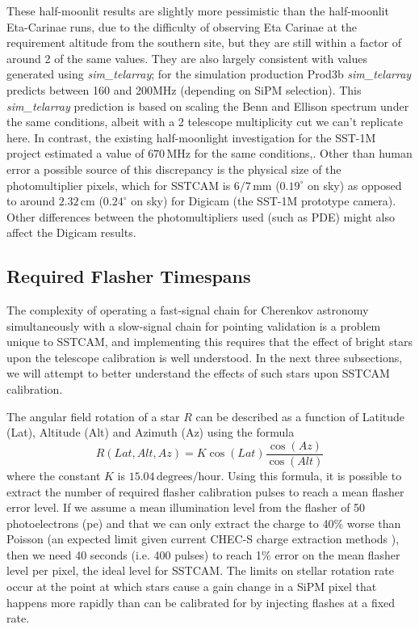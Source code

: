 These half-moonlit results are slightly more pessimistic than the half-moonlit Eta-Carinae runs, due to the difficulty of observing Eta Carinae at the requirement altitude from the southern site, but they are still within a factor of around 2 of the same values. They are also largely consistent with values generated using \textit{sim\_telarray}; for the simulation production Prod3b \textit{sim\_telarray} predicts between 160 and 200MHz (depending on SiPM selection). This \textit{sim\_telarray} prediction is based on scaling the Benn and Ellison spectrum under the same conditions, albeit with a 2 telescope multiplicity cut we can't replicate here. In contrast, the existing half-moonlight investigation for the SST-1M project \cite{1mcalib} estimated a value of $\mathrm{670\,MHz}$ for the same conditions,. Other than human error a possible source of this discrepancy is the physical size of the photomultiplier pixels, which for SSTCAM is $\mathrm{6/7\,mm}$ ($0.19^{\circ}$ on sky) as opposed to around $\mathrm{2.32\,cm}$ ($0.24^{\circ}$ on sky) for Digicam (the SST-1M prototype camera). Other differences between the photomultipliers used (such as PDE) might also affect the Digicam results. 

\subsection{Required Flasher Timespans}

The complexity of operating a fast-signal chain for Cherenkov astronomy simultaneously with a slow-signal chain for pointing validation is a problem unique to SSTCAM, and implementing this requires that the effect of bright stars upon the telescope calibration is well understood. In the next three subsections, we will attempt to better understand the effects of such stars upon SSTCAM calibration.

The angular field rotation of a star $R$ can be described as a function of Latitude (Lat), Altitude (Alt) and Azimuth (Az) using the formula
\begin{equation}
    R(Lat,Alt,Az)=K\cos(Lat)\frac{\cos(Az)}{\cos(Alt)}
    \label{eq:rot}
\end{equation}
where the constant $K$ is $\mathrm{15.04\,degrees/hour}$. Using this formula, it is possible to extract the number of required flasher calibration pulses to reach a mean flasher error level. If we assume a mean illumination level from the flasher of 50 photoelectrons (pe) and that we can only extract the charge to 40\% worse than Poisson (an expected limit given current CHEC-S charge extraction methods \cite{jasonthesis}), then we need 40 seconds (i.e. 400 pulses) to reach 1\% error on the mean flasher level per pixel, the ideal level for SSTCAM. The limits on stellar rotation rate occur at the point at which stars cause a gain change in a SiPM pixel that happens more rapidly than can be calibrated for by injecting flashes at a fixed rate.

